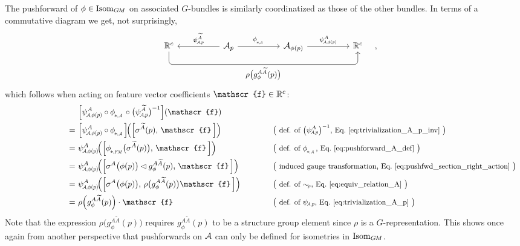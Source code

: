 The pushforward of $\phi \in \operatorname{Isom}_{G\mkern-1.4muM}$ on associated $G$-bundles is similarly coordinatized as those of the other bundles.
In terms of a commutative diagram we get, not surprisingly,
\begin{equation}\label{cd:pushforward_A_coord}
    \quad
    \begin{tikzcd}[row sep=4.em, column sep=5em]
        \R^c
            \arrow[rrr, pos=.5, rounded corners, to path={ 
                    -- ([yshift=-3.5ex]\tikztostart.south) 
                    --node[below]{\small$
                        \rho\big( g_\phi^{A\widetilde{A}}(p) \big)
                        $} ([yshift=-3.5ex]\tikztotarget.south) 
                    -- (\tikztotarget.south)
                    }]
        &
        \A_p
            \arrow[l, "\psiAp^{\widetilde{A}}"']
            \arrow[r, "\dphiA"]
        &
        \A_{\phi(p)}
            \arrow[r, "\psiAphip^A"]
        &
        \R^c
    \end{tikzcd}
    \quad,
\end{equation}
which follows when acting on feature vector coefficients $\mathscr{f}\in\R^c$:
\begin{alignat}{3}
    \qquad\qquad\qquad\qquad\quad
       & \Big[ \psiAphip^A \circ \dphiA \circ \big(\psiAp^{\widetilde{A}}\big)^{-1} \Big] (\mathscr{f}) \notag \\
    =\ & \Big[ \psiAphip^A \circ \dphiA \Big] \!\Big( \Big[ \sigma^{\widetilde{A}}(p), \,\mathscr{f}\, \Big] \Big)
        \qquad\quad && \big( \text{\small def. of $\big(\psiAp^A\big)^{-1}$, Eq.~\eqref{eq:trivialization_A_p_inv} } \big) \notag \\
    =\ & \psiAphip^A \!\Big( \Big[ \dphiFM\big( \sigma^{\widetilde{A}}(p) \big), \,\mathscr{f}\, \Big] \Big)
        \qquad\quad && \big( \text{\small def. of $\dphiA$, Eq.~\eqref{eq:pushforward_A_def} } \big) \notag \\
    =\ & \psiAphip^A \!\Big( \Big[ \sigma^A\big(\phi(p)\big) \lhd g_\phi^{A\widetilde{A}}(p), \,\mathscr{f}\, \Big] \Big)
        \qquad\quad && \big( \text{\small induced gauge transformation, Eq.~\eqref{eq:pushfwd_section_right_action} } \big) \notag \\
    =\ & \psiAphip^A \!\Big( \Big[ \sigma^A\big(\phi(p)\big), \, \rho\big( g_\phi^{A\widetilde{A}}(p) \big) \mathscr{f}\, \Big] \Big)
        \qquad\quad && \big( \text{\small def. of $\sim_{\!\rho}$, Eq.~\eqref{eq:equiv_relation_A} } \big) \notag \\
    =\ & \rho\Big( g_\phi^{A\widetilde{A}}(p) \Big) \cdot \mathscr{f}
        \qquad\quad && \big( \text{\small def. of $\psiAp$, Eq.~\eqref{eq:trivialization_A_p} } \big)
\end{alignat}
Note that the expression $\rho\big( g_\phi^{A\widetilde{A}}(p) \big)$ requires $g_\phi^{A\widetilde{A}}(p)$ to be a structure group element since $\rho$ is a $G$-representation.
This shows once again from another perspective that pushforwards on $\mathcal{A}$ can only be defined for isometries in $\operatorname{Isom}_{G\mkern-1.4muM}$.

